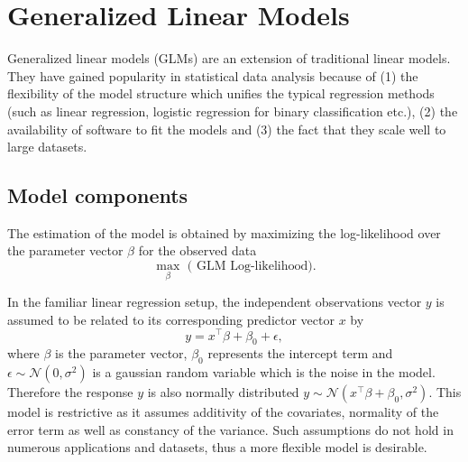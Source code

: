 \section{Generalized Linear Models}

Generalized linear models (GLMs) are an extension of traditional linear models. They have gained popularity in statistical data analysis because of (1) the flexibility of the model structure which unifies the typical regression methods (such as linear regression, logistic regression for binary classification etc.), (2) the availability of software to fit the models and (3) the fact that they scale well to large datasets. 

\subsection{Model components}

The estimation of the model is obtained by maximizing the log-likelihood over the parameter vector $\beta$ for the observed data
 $$\max_{\beta} \mbox{ ( GLM Log-likelihood)}.$$


In the familiar linear regression setup, the independent observations vector $y$ is assumed to be related to its corresponding predictor vector $x$ by $$y = x^{\top}\beta + \beta_0 + \epsilon,$$ where $\beta$ is the parameter vector, $\beta_0$ represents the intercept term and $\epsilon \sim \mathcal{N}( 0, \sigma^2 )$ is a gaussian random variable which is the noise in the model. Therefore the response $y$ is also normally distributed $y \sim \mathcal{N}( x^{\top} \beta + \beta_0, \sigma^2 )$. This model is restrictive as it assumes additivity of the covariates, normality of the error term as well as constancy of the variance. Such assumptions do not hold in numerous applications and datasets, thus a more flexible model is desirable. 


